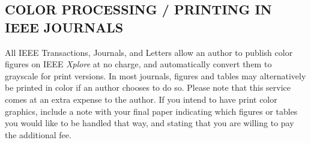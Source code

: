 \subsection{COLOR PROCESSING / PRINTING IN IEEE JOURNALS}
All IEEE Transactions, Journals, and Letters allow an author to publish 
color figures on IEEE \textit{Xplore}{\textregistered} at no charge, and automatically 
convert them to grayscale for print versions. In most journals, figures and 
tables may alternatively be printed in color if an author chooses to do so. 
Please note that this service comes at an extra expense to the author. If 
you intend to have print color graphics, include a note with your final 
paper indicating which figures or tables you would like to be handled that 
way, and stating that you are willing to pay the additional fee.